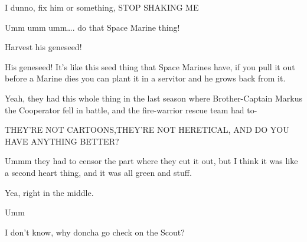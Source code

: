 

I dunno, fix him or something, STOP SHAKING ME



Umm umm umm…. 
do that Space Marine thing!



Harvest his geneseed!



His geneseed! 
It's like this seed thing that Space Marines have, if you pull it out before a Marine dies you can plant it in a servitor and he grows back from it. 




Yeah, they had this whole thing in the last season where Brother-Captain Markus the Cooperator fell in battle, and the fire-warrior rescue team had to-



THEY'RE NOT CARTOONS,THEY'RE NOT HERETICAL, AND DO YOU HAVE ANYTHING BETTER?



Ummm they had to censor the part where they cut it out, but I think it was like a second heart thing, and it was all green and stuff.



Yea, right in the middle.



Umm



I don't know, why doncha go check on the Scout?

